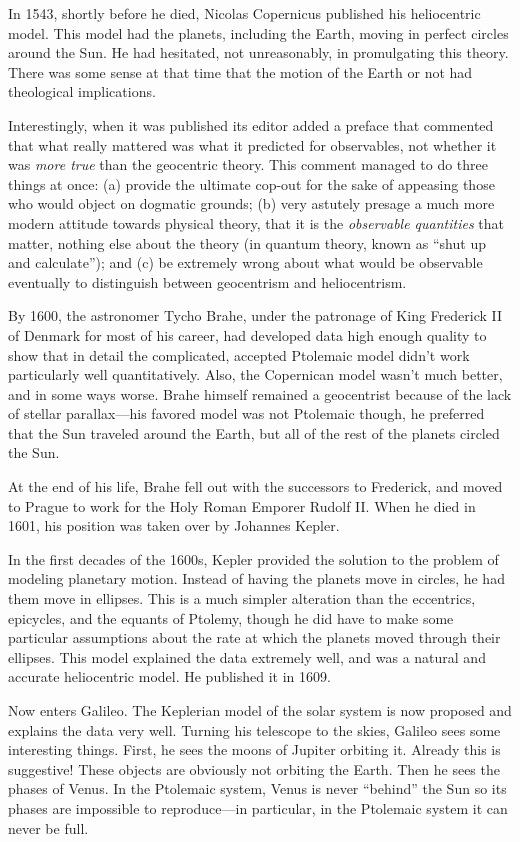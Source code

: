 \documentclass[12pt, preprint]{aastex}
\begin{document}
In 1543, shortly before he died, Nicolas Copernicus published his
heliocentric model. This model had the planets, including the Earth,
moving in perfect circles around the Sun. He had hesitated, not
unreasonably, in promulgating this theory. There was some sense at
that time that the motion of the Earth or not had theological
implications.

Interestingly, when it was published its editor added a preface that
commented that what really mattered was what it predicted for
observables, not whether it was {\it more true} than the geocentric
theory. This comment managed to do three things at once: (a) provide
the ultimate cop-out for the sake of appeasing those who would object
on dogmatic grounds; (b) very astutely presage a much more modern
attitude towards physical theory, that it is the {\it observable
  quantities} that matter, nothing else about the theory (in quantum
theory, known as ``shut up and calculate''); and (c) be extremely
wrong about what would be observable eventually to distinguish between
geocentrism and heliocentrism.

By 1600, the astronomer Tycho Brahe, under the patronage of King
Frederick II of Denmark for most of his career, had developed data
high enough quality to show that in detail the complicated, accepted
Ptolemaic model didn't work particularly well quantitatively. Also,
the Copernican model wasn't much better, and in some ways worse. Brahe
himself remained a geocentrist because of the lack of stellar
parallax---his favored model was not Ptolemaic though, he preferred
that the Sun traveled around the Earth, but all of the rest of the
planets circled the Sun.

At the end of his life, Brahe fell out with the successors to
Frederick, and moved to Prague to work for the Holy Roman Emporer
Rudolf II. When he died in 1601, his position was taken over by
Johannes Kepler.

In the first decades of the 1600s, Kepler provided the solution to the
problem of modeling planetary motion. Instead of having the planets
move in circles, he had them move in ellipses. This is a much simpler
alteration than the eccentrics, epicycles, and the equants of Ptolemy,
though he did have to make some particular assumptions about the rate
at which the planets moved through their ellipses. This model
explained the data extremely well, and was a natural and accurate
heliocentric model. He published it in 1609.

Now enters Galileo. The Keplerian model of the solar system is now
proposed and explains the data very well. Turning his telescope to the
skies, Galileo sees some interesting things. First, he sees the moons
of Jupiter orbiting it. Already this is suggestive! These objects are
obviously not orbiting the Earth. Then he sees the phases of Venus. In
the Ptolemaic system, Venus is never ``behind'' the Sun so its phases
are impossible to reproduce---in particular, in the Ptolemaic system
it can never be full.
\end{document}
